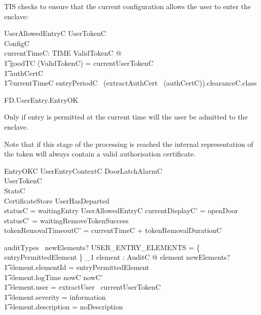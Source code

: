 TIS checks to ensure that the current configuration allows the user to
enter the enclave:

\begin{schema}{UserAllowedEntryC}
        UserTokenC
\\      ConfigC
\\      currentTimeC: TIME
\where
        \exists ValidTokenC @ 
\\ \t1  goodTC (\theta ValidTokenC) = currentUserTokenC
\\ \t1  \land authCertC \neq \Nil
\\ \t1  \land currentTimeC \in entryPeriodC~ (extractAuthCert~ (\The authCertC)).clearanceC.class 
\end{schema}


\begin{traceunit}{FD.UserEntry.EntryOK}
\end{traceunit}

Only if entry is permitted at the current time will the user be
admitted to the enclave.

Note that if this stage of the processing is reached the internal
representation of the token will always contain a valid authorisation
certificate.

\begin{schema}{EntryOKC}
        UserEntryContextC
\also
        \Xi DoorLatchAlarmC
\\      \Xi UserTokenC
\\      \Xi StatsC
\\      \Xi CertificateStore
\where
         \lnot UserHasDeparted
\\        statusC = waitingEntry
\also
        UserAllowedEntryC
\also
        currentDisplayC' = openDoor
\\      statusC' = waitingRemoveTokenSuccess
\\      tokenRemovalTimeoutC' = currentTimeC + tokenRemovalDurationC

\also
        auditTypes~ newElements? \cap USER\_ENTRY\_ELEMENTS = 
        \{ entryPermittedElement \} 
\also
        \exists_1 element : AuditC @ element \in newElements? 
\\ \t1  \land element.elementId = entryPermittedElement
\\ \t1  \land element.logTime \in nowC \upto nowC'
\\ \t1  \land element.user = extractUser~ currentUserTokenC
\\ \t1  \land element.severity = information
\\ \t1  \land element.description = noDescription

\end{schema}

